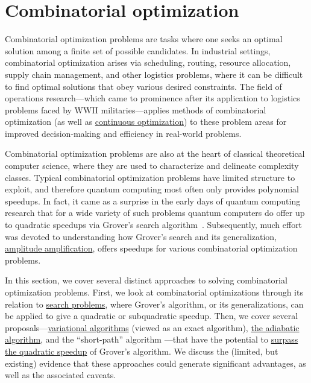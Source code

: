 
\section{Combinatorial optimization }\label{appl:CombOpt}

\begin{refsection}
Combinatorial optimization problems are tasks where one seeks an optimal solution among a finite set of possible candidates. In industrial settings, combinatorial optimization arises via scheduling, routing, resource allocation, supply chain management, and other logistics problems, where it can be difficult to find optimal solutions that obey various desired constraints. The field of operations research---which came to prominence after its application to logistics problems faced by WWII militaries---applies methods of combinatorial optimization (as well as \hyperref[appl:ContinuousOpt]{continuous optimization}) to these problem areas for improved decision-making and efficiency in real-world problems.

Combinatorial optimization problems are also at the heart of classical theoretical computer science, where they are used to characterize and delineate complexity classes. Typical combinatorial optimization problems  have limited structure to exploit, and therefore quantum computing most often only provides polynomial speedups. 
In fact, it came as a surprise in the early days of quantum computing research that for a wide variety of such problems quantum computers do offer up to quadratic speedups via Grover's search algorithm~\cite{grover1996QSearch}.
Subsequently, much effort was devoted to understanding how Grover's search and its generalization, \hyperref[prim:AmpAmp]{amplitude amplification}, offers speedups for various combinatorial optimization problems. 

In this section, we cover several distinct approaches to solving combinatorial optimization problems. First, we look at combinatorial optimizations through its relation to \hyperref[appl:SearchAlgorithms]{search problems}, where Grover's algorithm, or its generalizations, can be applied to give a quadratic or subquadratic speedup. Then, we cover several proposals---\hyperref[prim:VQA]{variational algorithms} (viewed as an exact algorithm), \hyperref[prim:QuantumAdiabaticAlgorithm]{the adiabatic algorithm}, and the ``short-path'' algorithm \cite{hastings2018ShortPathQuantum,dalzell2022mindthegap}---that have the potential to \hyperref[appl:BeyondGrover]{surpass the quadratic speedup} of Grover's algorithm. We discuss the (limited, but existing) evidence that these approaches could generate significant advantages, as well as the associated caveats. 


\end{refsection}
